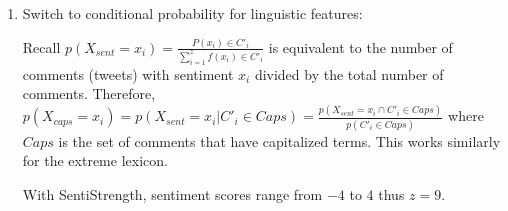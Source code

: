 \documentclass[a4paper,12pt]{article}
\begin{document}
\pagestyle{empty}

\begin{enumerate}

\item Switch to conditional probability for linguistic features:
  
Recall $p(X_{sent} = x_i) = \frac{P(x_i) \in C'_i}{\sum_{i=1}^{z} f(x_i) \in C'_i}$ is equivalent to the number of comments (tweets) with sentiment $x_i$ divided by the total number of comments. Therefore, $p(X_{caps} = x_i) = p(X_{sent} = x_i | C'_i \in Caps) = \frac{p(X_{sent} = x_i \cap C'_i \in Caps)}{p(C'_i \in Caps)}$ where $Caps$ is the set of comments that have capitalized terms. This works similarly for the extreme lexicon.

With SentiStrength, sentiment scores range from $-4$ to $4$ thus $z=9$.

\end{enumerate}
\end{document}
